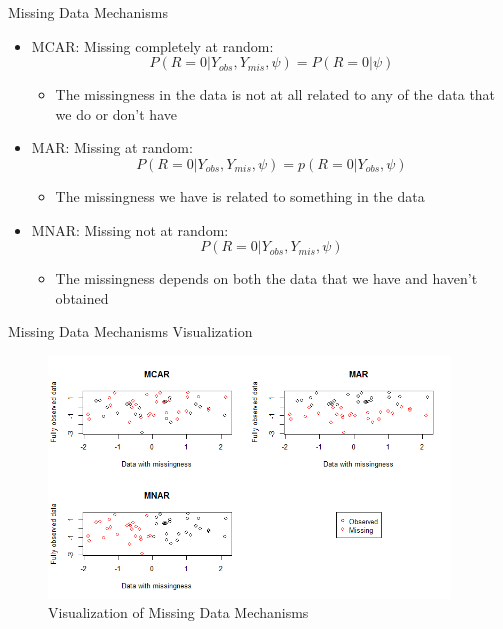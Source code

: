\begin{frame}{Missing Data Mechanisms}
\begin{itemize}

\item MCAR: Missing completely at random:  $$P(R=0|Y_{obs},Y_{mis},\psi)=P(R=0|\psi)$$
\begin{itemize}
\item The missingness in the data is not at all related to any of the data that we do or don't have
\end{itemize}
\item MAR: Missing at random: $$P(R=0|Y_{obs},Y_{mis},\psi)= p(R=0|Y_{obs},\psi)$$
\begin{itemize}
 \item The missingness we have is related to something in the data 
\end{itemize}
\item MNAR: Missing not at random: $$P(R=0|Y_{obs},Y_{mis},\psi)$$ 
\begin{itemize}
 \item  The missingness depends on both the data that we have and haven't obtained
\end{itemize}
\end{itemize}
\end{frame}

\begin{frame}{Missing Data Mechanisms Visualization}

 \begin{figure}[h!]
  \centering
    \includegraphics[width=0.95\textwidth]{md_mechanism}
  \caption{Visualization of Missing Data Mechanisms}
\label{fig:miviz}
\end{figure}
 
\end{frame}

